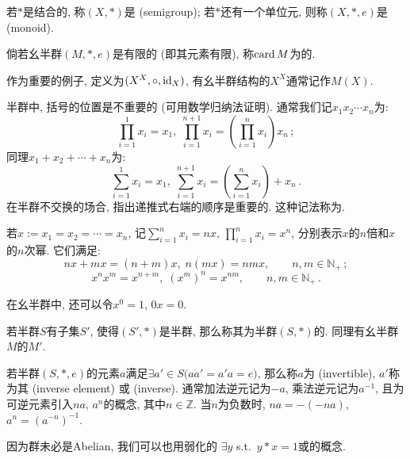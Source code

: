\documentclass[openany, a5paper, oneside]{ctexbook}
\begin{document}
\begin{definition}[半群和幺半群]
	若$*$是结合的, 称$(X,*)$是 (semigroup); 
	若$*$还有一个单位元, 则称$(X,*, e)$是 (monoid).
\end{definition}

倘若幺半群$(M, *, e)$是有限的 (即其元素有限), 称$\operatorname{card} M$为的.

作为重要的例子,  定义为$(X^X, \circ, \operatorname{id}_X)$, 有幺半群结构的$X^X$通常记作$M(X)$.

半群中, 括号的位置是不重要的 (可用数学归纳法证明). 通常我们记$x_1x_2 \cdots x_n$为:
\begin{equation}
	\prod_{i=1}^1 x_i = x_1,\;\prod_{i=1}^{n+1} x_i = \left( \prod_{i=1}^n x_i  \right) x_n\,;
\end{equation}
同理$x_1+x_2+\cdots + x_n$为:
\begin{equation}
	\sum_{i=1}^1 x_i = x_1,\;\sum_{i=1}^{n+1} x_i = \left( \sum_{i=1}^n x_i  \right) + x_n\,.
\end{equation}
在半群不交换的场合, 指出递推式右端的顺序是重要的. 这种记法称为.

若$x := x_1 = x_2 = \cdots = x_n$, 记$\sum_{i=1}^n x_i = nx$, $\prod_{i=1}^n x_i = x^n$, 分别表示$x$的$n$倍和$x$的$n$次幂. 它们满足:
\begin{equation}
	nx+mx = (n+m)x, \; n(m x) = nm x, \qquad n,m\in \mathbb N_+\,;
\end{equation}
\begin{equation}\label{exoponentiation}
	x^n x^m = x^{n+m}, \; (x^m)^n = x^{nm}, \qquad n,m \in \mathbb N_+\,.
\end{equation}

在幺半群中, 还可以令$x^0 = 1$, $0x = 0$.

若半群$S$有子集$S'$, 使得$(S',*)$是半群, 那么称其为半群$(S,*)$的.
同理有幺半群\nolinebreak$M$的$M'$. 

若半群$(S,*, e)$的元素$a$满足$\exists a'\in S\big(
	a a' = a' a = e
\big)$, 那么称$a$为 (invertible), $a'$称为其 (inverse element) 或 (inverse).
通常加法逆元记为$- a$, 乘法逆元记为$a^{-1}$, 且为可逆元素引入$n a$, $a^n$的概念, 其中$n \in \mathbb Z$. 当$n$为负数时, $na = -(-na)$, $a^n = (a^{-n})^{-1}$.

因为群未必是Abelian, 我们可以也用弱化的 $\exists y$ s.t.\ $y * x = 1$或的概念.
\end{document}
